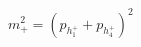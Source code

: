 \documentclass[border={1pt 1pt 1pt 1pt}]{standalone}
\begin{document}
$m_+^2 = (p_{h_1^+} + p_{h_4^+})^2$
\end{document}
